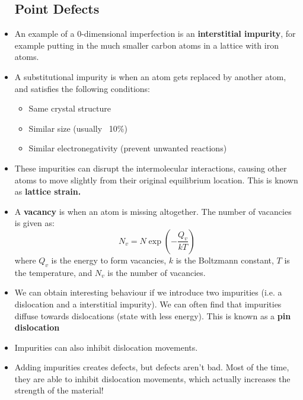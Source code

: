 \begin{itemize}
    \subsection{Point Defects}
    \item An example of a 0-dimensional imperfection is an \textbf{interstitial impurity}, for example putting in the much smaller carbon atoms in a lattice with iron atoms.
    \item A substitutional impurity is when an atom gets replaced by another atom, and satisfies the following conditions:
    \begin{itemize}
        \item Same crystal structure
        \item Similar size (usually ~10\%)
        \item Similar electronegativity (prevent unwanted reactions)
    \end{itemize}
    \item These impurities can disrupt the intermolecular interactions, causing other atoms to move slightly from their original equilibrium location. This is known as \textbf{lattice strain.}
    \item A \textbf{vacancy} is when an atom is missing altogether. The number of vacancies is given as:
    \begin{equation}
        N_v = N\exp\left(-\frac{Q_v}{kT}\right)
    \end{equation}
    where $Q_v$ is the energy to form vacancies, $k$ is the Boltzmann constant, $T$ is the temperature, and $N_v$ is the number of vacancies.
    \item We can obtain interesting behaviour if we introduce two impurities (i.e. a dislocation and a interstitial impurity). We can often find that impurities diffuse towards dislocations (state with less energy). This is known as a \textbf{pin dislocation}
    \item Impurities can also inhibit dislocation movements.
    \item Adding impurities creates defects, but defects aren't bad. Most of the time, they are able to inhibit dislocation movements, which actually increases the strength of the material!

\end{itemize}
